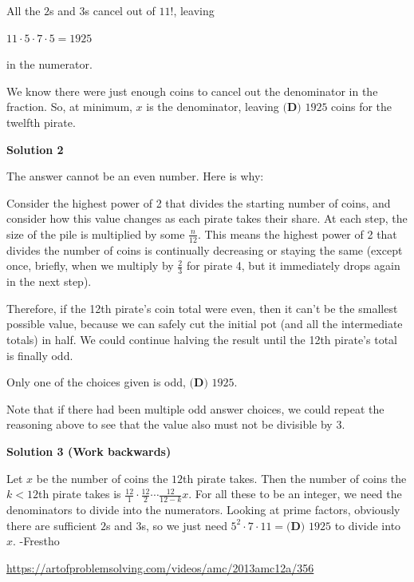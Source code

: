 \begin{enumerate}
 
All the $2$s and $3$s cancel out of $11!$, leaving

 $11 \cdot 5 \cdot 7 \cdot 5 = 1925$

 in the numerator.

 
We know there were just enough coins to cancel out the denominator in the fraction. So, at minimum, $x$ is the denominator, leaving $\boxed{\textbf{(D) }1925}$ coins for the twelfth pirate.

 



\textbf{Solution 2}

The answer cannot be an even number. Here is why:

 Consider the highest power of 2 that divides the starting number of coins, and consider how this value changes as each pirate takes their share. At each step, the size of the pile is multiplied by some $\frac{n}{12}$. This means the highest power of 2 that divides the number of coins is continually decreasing or staying the same (except once, briefly, when we multiply by $\frac{2}{3}$ for pirate 4, but it immediately drops again in the next step).

 Therefore, if the 12th pirate's coin total were even, then it can't be the smallest possible value, because we can safely cut the initial pot (and all the intermediate totals) in half. We could continue halving the result until the 12th pirate's total is finally odd.

 Only one of the choices given is odd, $\boxed{\textbf{(D) }1925}$.

 Note that if there had been multiple odd answer choices, we could repeat the reasoning above to see that the value also must not be divisible by 3.

 



\textbf{Solution 3 (Work backwards)}

Let $x$ be the number of coins the $12$th pirate takes. Then the number of coins the $k<12$th pirate takes is $\frac{12}{1} \cdot \frac{12}{2} \cdots \frac{12}{12-k} x$. For all these to be an integer, we need the denominators to divide into the numerators. Looking at prime factors, obviously there are sufficient $2$s and $3$s, so we just need $5^2 \cdot 7 \cdot 11 = \boxed{\textbf{(D) }1925}$ to divide into $x$. -Frestho

 \href{https://artofproblemsolving.com/videos/amc/2013amc12a/356}{https://artofproblemsolving.com/videos/amc/2013amc12a/356}


\end{enumerate}
